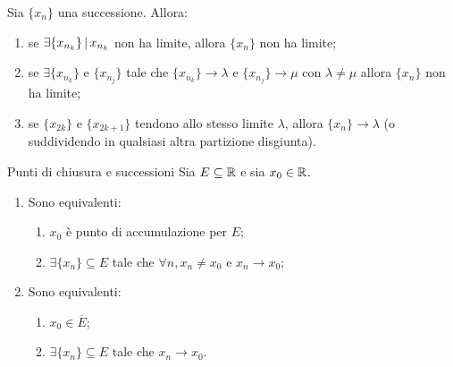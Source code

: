\documentclass[a4paper]{article}
\begin{document}
\begin{snippetcorollary}{}
    Sia \(\{x_n\}\) una successione. Allora:
    \begin{enumerate}
        \item se \(\exists \{x_{n_k}\} \,|\, x_{n_k}\) non ha limite, allora \(\{x_n\}\) non ha limite;
        \item se \(\exists \{x_{n_k}\}\) e \(\{x_{n_j}\}\) tale che
        \(\{x_{n_k}\} \to \lambda\) e \(\{x_{n_j}\} \to \mu\) con \(\lambda \neq \mu\)
        allora \(\{x_n\}\) non ha limite;
        \item se \(\{x_{2k}\}\) e \(\{x_{2k+1}\}\) tendono allo stesso limite \(\lambda\),
        allora \(\{x_n\} \to \lambda\) (o suddividendo in qualsiasi altra partizione disgiunta).
    \end{enumerate}
\end{snippetcorollary}

\begin{snippettheorem}{Punti di chiusura e successioni}
    Sia \(E\subseteq \mathbb{R}\) e sia \(x_0 \in \mathbb{R}\).
    \begin{enumerate}
        \item Sono equivalenti:
        \begin{enumerate}
            \item \(x_0\) è punto di accumulazione per \(E\);
            \item \(\exists \{x_n\} \subseteq E\) tale che \(\forall n, x_n \neq x_0\) e \(x_n \to x_0\);
        \end{enumerate}
        \item Sono equivalenti:
        \begin{enumerate}
            \item \(x_0 \in \overline{E}\);
            \item \(\exists \{x_n\} \subseteq E\) tale che \(x_n \to x_0\).
        \end{enumerate}
    \end{enumerate}
\end{snippettheorem}
\end{document}

